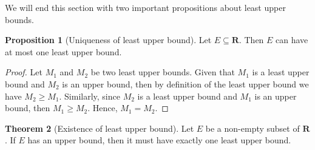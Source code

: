 \documentclass[12pt,a4paper]{article}
\theoremstyle{definition}
\newtheorem{theorem}{Theorem}[section]
\newtheorem{proposition}[theorem]{Proposition}
\newtheorem{example}{Example}[section]
\begin{document}

We will end this section with two important propositions about least upper bounds.

\begin{proposition}[Uniqueness of least upper bound]
  Let $E \subseteq \textbf{R}$. Then $E$ can have at most one least upper bound.
\end{proposition}

\begin{proof}
  Let $M_1$ and $M_2$ be two least upper bounds. Given that $M_1$ is a least upper bound and $M_2$ is an upper bound, then by definition of the least upper bound we have $M_2 \geq M_1$. Similarly, since $M_2$ is a least upper bound and $M_1$ is an upper bound, then $M_1 \geq M_2$. Hence, $M_1 = M_2$. 
\end{proof}

\begin{theorem}[Existence of least upper bound]
  Let $E$ be a non-empty subset of $\textbf{R}$. If $E$ has an upper bound, then it must have exactly one least upper bound.
\end{theorem}
\end{document}
